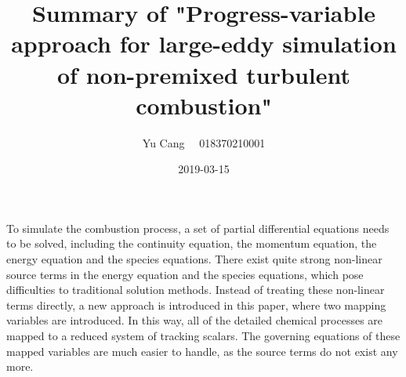 \documentclass[paper=a4, fontsize=11pt]{scrartcl}
\title{Summary of "Progress-variable approach for large-eddy simulation of non-premixed turbulent combustion"}
\author{Yu Cang \ \ 018370210001}
\date{2019-03-15}
\begin{document}
\maketitle

To simulate the combustion process, a set of partial differential equations needs to be solved, including the continuity equation, the momentum equation, the energy equation and the species equations. There exist quite strong non-linear source terms in the energy equation and the species equations, which pose difficulties to traditional solution methods.\newline
Instead of treating these non-linear terms directly, a new approach is introduced in this paper, where two mapping variables are introduced. In this way, all of the detailed chemical processes are mapped to a reduced system of tracking scalars. The governing equations of these mapped variables are much easier to handle, as the source terms do not exist any more. 

	
\end{document}
